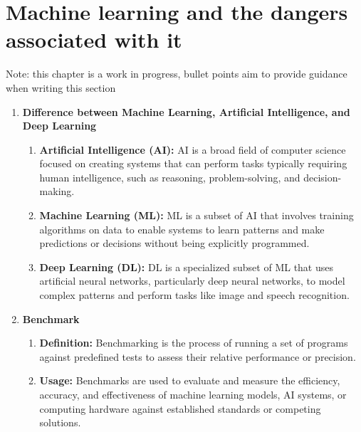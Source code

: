 \documentclass[licencjacka,en]{pracamgr}
\begin{document}
\chapter{Machine learning and the dangers associated with it}
Note: this chapter is a work in progress, bullet points aim to provide guidance when writing this section

\begin{enumerate}
    \raggedright
    \item \textbf{Difference between Machine Learning, Artificial Intelligence, and Deep Learning}
    \begin{enumerate}
        \item \textbf{Artificial Intelligence (AI):} AI is a broad field of computer science focused on creating systems that can perform tasks typically requiring human intelligence, such as reasoning, problem-solving, and decision-making.
        \item \textbf{Machine Learning (ML):} ML is a subset of AI that involves training algorithms on data to enable systems to learn patterns and make predictions or decisions without being explicitly programmed.
        \item \textbf{Deep Learning (DL):} DL is a specialized subset of ML that uses artificial neural networks, particularly deep neural networks, to model complex patterns and perform tasks like image and speech recognition.
    \end{enumerate}

    \item \textbf{Benchmark}
    \begin{enumerate}
        \item \textbf{Definition:} Benchmarking is the process of running a set of programs against predefined tests to assess their relative performance or precision.
        \item \textbf{Usage:} Benchmarks are used to evaluate and measure the efficiency, accuracy, and effectiveness of machine learning models, AI systems, or computing hardware against established standards or competing solutions.
    \end{enumerate}


\end{enumerate}
\end{document}
